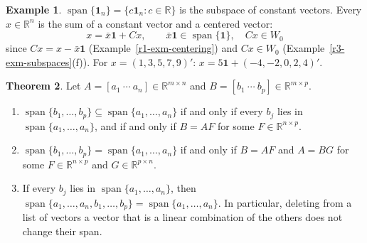\documentclass[12pt]{article}
\newcommand{\R}{\mathbb R}
\newcommand{\one}{\mathbf 1}
\DeclareMathOperator{\Span}{span}
\theoremstyle{definition}
\newtheorem{theorem}{Theorem}
\newtheorem{example}[theorem]{Example}
\begin{document}
\begin{example}\label{r3-exm-constant}
\(\Span\{\one_n\}=\{c\one_n:c\in\R\}\) is the subspace of constant vectors. Every
\(x\in\R^n\) is the sum of a constant vector and a centered vector:
\[
x=\bar x\one+Cx,\qquad \bar x\one\in\Span\{\one\},\quad Cx\in W_0
\]
since \(Cx=x-\bar x\one\) (Example~\ref{r1-exm-centering}) and \(Cx\in W_0\)
(Example~\ref{r3-exm-subspaces}(f)). For \(x=(1,3,5,7,9)'\):
\(x=5\one+(-4,-2,0,2,4)'\).
\end{example}

\begin{theorem}\label{r3-thm-span-inclusion}
Let \(A=[a_1\ \cdots\ a_n]\in\R^{m\times n}\) and \(B=[b_1\ \cdots\ b_p]\in\R^{m\times p}\).
\begin{enumerate}
\item \(\Span\{b_1,\dots,b_p\}\subseteq\Span\{a_1,\dots,a_n\}\) if and only if every \(b_j\) lies in
\(\Span\{a_1,\dots,a_n\}\), and if and only if \(B=AF\) for some \(F\in\R^{n\times p}\).
\item \(\Span\{b_1,\dots,b_p\}=\Span\{a_1,\dots,a_n\}\) if and only if \(B=AF\) and \(A=BG\) for some
\(F\in\R^{n\times p}\) and \(G\in\R^{p\times n}\).
\item If every \(b_j\) lies in \(\Span\{a_1,\dots,a_n\}\), then
\(\Span\{a_1,\dots,a_n,b_1,\dots,b_p\}=\Span\{a_1,\dots,a_n\}\). In particular, deleting from a list of
vectors a vector that is a linear combination of the others does not change their span.
\end{enumerate}
\end{theorem}
\end{document}
